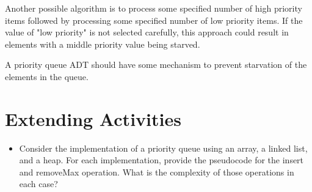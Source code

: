 Another possible algorithm is to process some specified number of high priority items followed by processing some specified number of  low priority items. If the value of "low priority" is not selected carefully, this approach could result in elements with a middle priority value being starved.

A priority queue ADT should have some mechanism to prevent starvation of the elements in the queue.

\section{Extending Activities}
\begin{itemize}
\item Consider the implementation of a priority queue using an array, a linked list,  and a heap.   For each implementation,  provide the pseudocode for the insert and removeMax operation.  What is the complexity of those operations in each case?

\end{itemize}




